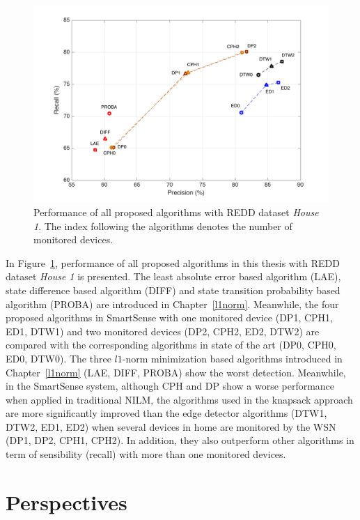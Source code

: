 \begin{figure}[h]
\centering
\includegraphics[width=1\textwidth]{./chapters/Conclusion/all_perfcomp.pdf} 
\caption{Performance of all proposed algorithms with REDD dataset \emph{House 1}. The index following the algorithms denotes the number of monitored devices.} 
\label{fig:C1} 
\end{figure}

\par In Figure~\ref{fig:C1}, performance of all proposed algorithms in this thesis with REDD dataset \emph{House 1} is presented. The least absolute error based algorithm (LAE), state difference based algorithm (DIFF) and state transition probability based algorithm (PROBA) are introduced in Chapter~\ref{l1norm}. Meanwhile, the four proposed algorithms in SmartSense with one monitored device (DP1, CPH1, ED1, DTW1) and two monitored devices (DP2, CPH2, ED2, DTW2) are compared with the corresponding algorithms in state of the art (DP0, CPH0, ED0, DTW0). The three $l1$-norm minimization based algorithms introduced in Chapter~\ref{l1norm} (LAE, DIFF, PROBA) show the worst detection. Meanwhile, in the SmartSense system, although CPH and DP show a worse performance when applied in traditional NILM, the algorithms used in the knapsack approach are more significantly improved than the edge detector algorithms (DTW1, DTW2, ED1, ED2) when several devices in home are monitored by the WSN (DP1, DP2, CPH1, CPH2). In addition, they also outperform other algorithms in term of sensibility (recall) with more than one monitored devices.


\section{Perspectives}

